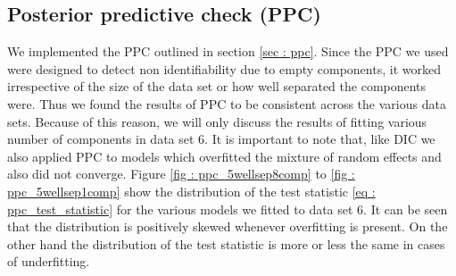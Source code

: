 \subsection{Posterior predictive check (PPC)}
\label{subsec : ppc_simulation}
We implemented the PPC outlined in section \ref{sec : ppc}. Since the PPC we used were designed to detect non identifiability due to empty components, it worked irrespective of the size of the data set or how well separated the components were. Thus we found the results of PPC to be consistent across the various data sets. Because of this reason, we will only discuss the results of fitting various number of components in data set 6. It is important to note that, like DIC we also applied PPC to models which overfitted the mixture of random effects and also did not converge. Figure \ref{fig : ppc_5wellsep8comp} to \ref{fig : ppc_5wellsep1comp} show the distribution of the test statistic \ref{eq : ppc_test_statistic} for the various models we fitted to data set 6. It can be seen that the distribution is positively skewed whenever overfitting is present. On the other hand the distribution of the test statistic is more or less the same in cases of underfitting.\\

